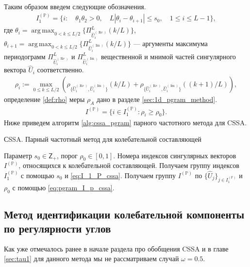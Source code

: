 \documentclass[specialist,
               substylefile = spbu.rtx,
               subf,href,colorlinks=true, 12pt]{disser}
\def\RE{\mathop{\mathrm{Re}}}
\def\argmax{\mathop{\mathrm{argmax}}}
\def\IM{\mathop{\mathrm{Im}}}
\def\argmax{\mathop{\mathrm{arg\,max}}}
\begin{document}
 
Таким образом введем следующие обозначения.  
\begin{gather} \label{eq:I_1_P_cssa}
I_1^{(\mathbb{P})} = \{ i: \quad \theta_1 \theta_2 >0, \quad L |\theta_i - \theta_{i+1}| \leqslant s_0, \quad 1 \leqslant i \leqslant L -1  \},
\end{gather}
где $\theta_i = \argmax_{0 < k \leqslant L/2} \{\Pi_{\widehat{U}^{(\RE)}_{i}}^L(k/L)\}$, $\theta_{i+1} = \argmax_{0 < k \leqslant L/2} \{\Pi_{\widehat{U}^{(\IM)}_{i}}^L(k/L)\}$ --- аргументы максимума периодограмм $\Pi_{\widehat{U}^{(\RE)}_{i}}^L$ и $\Pi_{\widehat{U}^{(\IM)}_{i}}^L$ вещественной и мнимой частей сингулярного вектора $\widehat{U}_i$ соответственно.
\begin{gather*}
\rho_{i} := \max_{0 \leqslant k \leqslant L/2}{\left(\rho_{\{\widehat{U}^{(\RE)}_{i},\widehat{U}^{(\IM)}_{i}\}}(k/L) + \rho_{\{\widehat{U}^{(\RE)}_{i},\widehat{U}^{(\IM)}_{i}\}}((k+1)/L)\right)},
\end{gather*}
определение \ref{def:rho} меры $\rho_A$ дано в разделе \ref{sec:1d_pgram_method}.
\begin{gather} \label{eq:pgram_I_p_cssa}
I^{(\mathbb{P})} = \{ i \in I_1^{(\mathbb{P})}: \rho_{i} \geqslant\rho_0 \}.
\end{gather}
Ниже приведем алгоритм \ref{alg:cssa_pgram} парного частотного метода для CSSA.
\begin{algorithm}[!hhh]
\caption{СSSA. Парный частотный метод для колебательной составляющей}
\label{alg:cssa_pgram}
\begin{algorithmic}[1]
\REQUIRE Параметр $s_0 \in \mathsf{Z}_{+}$, порог $\rho_0 \in [0,1]$.
\ENSURE Номера индексов сингулярных векторов $I^{(\mathbb{P})}$, относящихся к колебательной составляющей.
\STATE  Получаем группу индексов $I_1^{(\mathbb{P})}$ с помощью $s_0$ и \eqref{eq:I_1_P_cssa}.
\STATE Получаем группу $I^{(\mathbb{P})}$ по $\{\widehat{U}_j\}_{j \in I_1^{(\mathbb{P})}}$ и $\rho_0$ с помощью \eqref{eq:pgram_I_p_cssa}.
\end{algorithmic}
\end{algorithm}


\newpage
\subsection{Метод идентификации колебательной компоненты по регулярности углов}
\label{sec:tau_cssa}
Как уже отмечалось ранее в начале раздела про обобщения CSSA и в главе \ref{sec:tau1} для данного метода мы не рассматриваем случай $\omega=0.5$.
\end{document}

